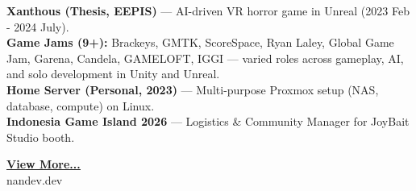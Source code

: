 \documentclass[11pt,a4paper]{article}
\begin{document}
\begin{minipage}[t]{18cm}
\begin{minipage}[t]{17cm}
\textbf{Xanthous (Thesis, EEPIS)} — AI-driven VR horror game in Unreal (2023 Feb - 2024 July).\\
\textbf{Game Jams (9+):} Brackeys, GMTK, ScoreSpace, Ryan Laley, Global Game Jam, Garena, Candela, GAMELOFT, IGGI — varied roles across gameplay, AI, and solo development in Unity and Unreal.\\
\textbf{Home Server (Personal, 2023)} — Multi-purpose Proxmox setup (NAS, database, compute) on Linux.\\
\textbf{Indonesia Game Island 2026} — Logistics \& Community Manager for JoyBait Studio booth.

\end{minipage}

\vspace{0.8cm}

\begin{center}
\href{https://nandev.dev}{\bfseries\color{accent}\underline{View More...}}\\[4pt]
{\small nandev.dev}
\end{center}

\end{minipage}
\end{document}
